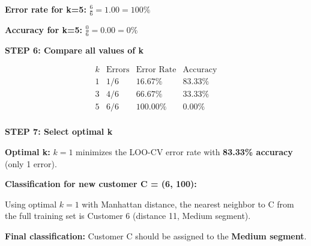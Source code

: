 \documentclass[12pt]{article}
\begin{document}
\begin{solution}
\textbf{Error rate for k=5:} \(\boxed{\frac{6}{6} = 1.00 = 100\%}\)

\textbf{Accuracy for k=5:} \(\boxed{\frac{0}{6} = 0.00 = 0\%}\)

\textbf{STEP 6: Compare all values of k}

\[
\begin{array}{c|c|c|c}
k & \text{Errors} & \text{Error Rate} & \text{Accuracy} \\
\hline
1 & 1/6 & 16.67\% & \mathbf{83.33\%} \\
3 & 4/6 & 66.67\% & 33.33\% \\
5 & 6/6 & 100.00\% & 0.00\% \\
\end{array}
\]

\textbf{STEP 7: Select optimal k}

\textbf{Optimal k:} \(\boxed{k = 1}\) minimizes the LOO-CV error rate with \textbf{83.33\% accuracy} (only 1 error).

\textbf{Classification for new customer C = (6, 100):}

Using optimal \(k=1\) with Manhattan distance, the nearest neighbor to C from the full training set is Customer 6 (distance 11, Medium segment).

\textbf{Final classification:} Customer C should be assigned to the \textbf{Medium segment}.
\end{solution}
\end{document}

